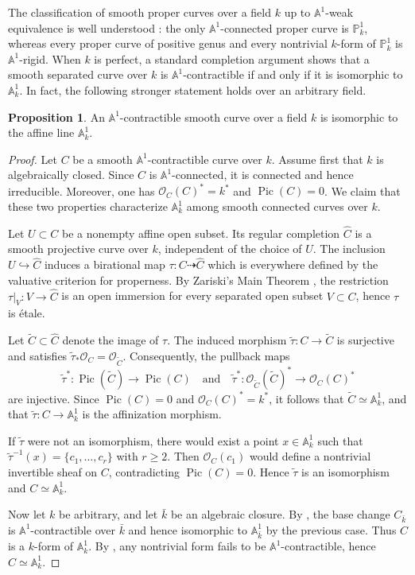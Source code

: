 \documentclass[10pt]{amsart}
\renewcommand{\AA}{\mathbb{A}}
\numberwithin{equation}{section} %
\theoremstyle{plain}
\theoremstyle{definition}
\newtheorem{prop}[prop]{Proposition}
\theoremstyle{remark}
\newcommand{\PP}{\mathbb{P}}
\newcommand{\Pic}{\operatorname{Pic}}
\begin{document}
The classification of smooth proper curves over a field $k$ up to $\AA^1$-weak equivalence is well understood \cite[Proposition 2.1.12]{AM11}: the only $\AA^1$-connected proper curve is $\PP^1_k$, whereas every proper curve of positive genus and every nontrivial $k$-form of $\PP^1_k$ is $\AA^1$-rigid. When $k$ is perfect, a standard completion argument shows that a smooth separated curve over $k$ is $\AA^1$-contractible if and only if it is isomorphic to $\AA^1_k$. In fact, the following stronger statement holds over an arbitrary field.

\begin{prop}\label{1-dim theorem}
An $\AA^1$-contractible smooth curve over a field $k$ is isomorphic to the affine line $\AA^1_k$. 
\end{prop}

\begin{proof}
Let $C$ be a smooth $\AA^1$-contractible curve over $k$. Assume first that $k$ is algebraically closed. Since $C$ is $\AA^1$-connected, it is connected and hence irreducible. Moreover, one has $\mathcal{O}_C(C)^*=k^*$ and $\Pic(C)=0$. We claim that these two properties characterize $\AA^1_k$ among smooth connected curves over $k$.
\medskip

Let $U\subset C$ be a nonempty affine open subset. Its regular completion $\hat{C}$ is a smooth projective curve over $k$, independent of the choice of $U$. The inclusion $U\hookrightarrow \hat{C}$ induces a birational map $\tau:C\dashrightarrow \hat{C}$ which is everywhere defined by the valuative criterion for properness. By Zariski’s Main Theorem \cite[Corollaire 8.12.10]{EGAIV-Grothendieck1966}, the restriction $\tau|_V:V\to \hat{C}$ is an open immersion for every separated open subset $V\subset C$, hence $\tau$ is \'etale.
\medskip

Let $\tilde{C}\subset \hat{C}$ denote the image of $\tau$. The induced morphism $\tilde{\tau}:C\to \tilde{C}$ is surjective and satisfies $\tilde{\tau}_*\mathcal{O}_C=\mathcal{O}_{\tilde{C}}$. Consequently, the pullback maps
\[
\tilde{\tau}^*:\Pic(\tilde{C})\to \Pic(C)
\quad\text{and}\quad
\tilde{\tau}^*:\mathcal{O}_{\tilde{C}}(\tilde{C})^*\to \mathcal{O}_C(C)^*
\]
are injective. Since $\Pic(C)=0$ and $\mathcal{O}_C(C)^*=k^*$, it follows that $\tilde{C}\simeq \AA^1_k$, and that $\tilde{\tau}:C\to \AA^1_k$ is the affinization morphism.
\medskip

If $\tilde{\tau}$ were not an isomorphism, there would exist a point $x\in \AA^1_k$ such that $\tilde{\tau}^{-1}(x)=\{c_1,\dots,c_r\}$ with $r\ge 2$. Then $\mathcal{O}_C(c_1)$ would define a nontrivial invertible sheaf on $C$, contradicting $\Pic(C)=0$. Hence $\tilde{\tau}$ is an isomorphism and $C\simeq \AA^1_k$.

Now let $k$ be arbitrary, and let $\bar{k}$ be an algebraic closure. By , the base change $C_{\bar{k}}$ is $\AA^1$-contractible over $\bar{k}$ and hence isomorphic to $\AA^1_{\bar{k}}$ by the previous case. Thus $C$ is a $k$-form of $\AA^1_k$. By , any nontrivial form fails to be $\AA^1$-contractible, hence $C\simeq \AA^1_k$.
\end{proof}
\end{document}
